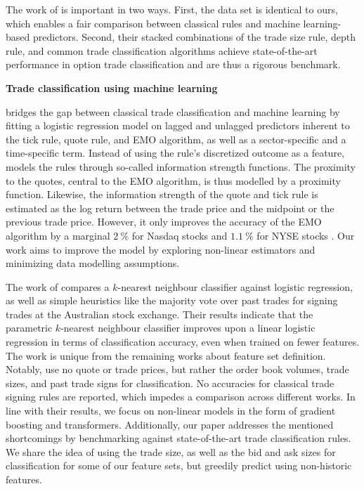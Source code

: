 The work of \textcite{grauerOptionTradeClassification2022} is important in two ways. First, the data set is identical to ours, which enables a fair comparison between classical rules and machine learning-based predictors. Second, their stacked combinations of the trade size rule, depth rule, and common trade classification algorithms achieve state-of-the-art performance in option trade classification and are thus a rigorous benchmark.

\textbf{Trade classification using machine learning}

\textcite[\pno~5]{rosenthalModelingTradeDirection2012} bridges the gap between classical trade classification and machine learning by fitting a logistic regression model on lagged and unlagged predictors inherent to the tick rule, quote rule, and EMO algorithm, as well as a sector-specific and a time-specific term. Instead of using the rule's discretized outcome as a feature, \textcite[\pno~481f.]{rosenthalModelingTradeDirection2012} models the rules through so-called information strength functions. The proximity to the quotes, central to the EMO algorithm, is thus modelled by a proximity function. Likewise, the information strength of the quote and tick rule is estimated as the log return between the trade price and the midpoint or the previous trade price. However, it only improves the accuracy of the EMO algorithm by a marginal $2~\%$ for Nasdaq stocks and $1.1~\%$ for NYSE stocks \textcite[\pno~15]{rosenthalModelingTradeDirection2012}. Our work aims to improve the model by exploring non-linear estimators and minimizing data modelling assumptions.

The work of \textcite[\pno~481f.]{blazejewskiLocalNonParametricModel2005} compares a $k$-nearest neighbour classifier against logistic regression, as well as simple heuristics like the majority vote over past trades for signing trades at the Australian stock exchange. Their results indicate that the parametric $k$-nearest neighbour classifier improves upon a linear logistic regression in terms of classification accuracy, even when trained on fewer features. The work is unique from the remaining works about feature set definition. Notably, \textcite[\pno~3]{blazejewskiLocalNonParametricModel2005} use no quote or trade prices, but rather the order book volumes, trade sizes, and past trade signs for classification. No accuracies for classical trade signing rules are reported, which impedes a comparison across different works. In line with their results, we focus on non-linear models in the form of gradient boosting and transformers. Additionally, our paper addresses the mentioned shortcomings by benchmarking against state-of-the-art trade classification rules. We share the idea of using the trade size, as well as the bid and ask sizes for classification for some of our feature sets, but greedily predict using non-historic features.

